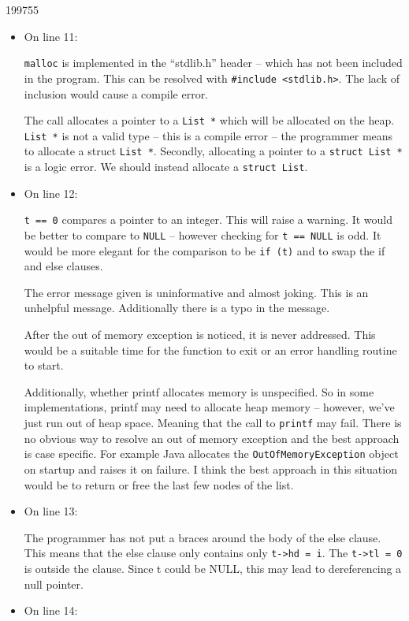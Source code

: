 \documentclass[10pt,\jkfside,a4paper]{article}
\begin{document}
\begin{examquestion}{1997}{5}{5}
\begin{itemize}
\item On line 11:

\texttt{malloc} is implemented in the ``stdlib.h'' header -- which has not been
included in the program. This can be resolved with \texttt{\#include <stdlib.h>}.
The lack of inclusion would cause a compile error.

The call allocates a pointer to a \texttt{List *} which will be allocated on
the heap. \texttt{List *} is not a valid type -- this is a compile error -- the
programmer means to allocate a struct \texttt{List *}. Secondly, allocating a
pointer to a \texttt{struct List *} is a logic error. We should instead allocate
a \texttt{struct List}.

\item On line 12:

\texttt{t == 0} compares a pointer to an integer. This will raise a warning.
It would be better to compare to \texttt{NULL} -- however checking for
\texttt{t == NULL} is odd. It would be more elegant for the comparison to be
\texttt{if (t)} and to swap the if and else clauses.

The error message given is uninformative and almost joking. This is an
unhelpful message. Additionally there is a typo in the message.

After the out of memory exception is noticed, it is never addressed. This
would be a suitable time for the function to exit or an error handling
routine to start.

Additionally, whether printf allocates memory is unspecified. So in some
implementations, printf may need to allocate heap memory -- however, we've
just run out of heap space. Meaning that the call to \texttt{printf} may
fail. There is no obvious way to resolve an out of memory exception and the
best approach is case specific. For example Java allocates the
\texttt{OutOfMemoryException} object on startup and raises it on failure. I
think the best approach in this situation would be to return or free the
last few nodes of the list.

\item On line 13:

The programmer has not put a braces around the body of the else clause.
This means that the else clause only contains only \texttt{t->hd = i}. The
\texttt{t->tl = 0} is outside the clause. Since t could be NULL, this may lead to
dereferencing a null pointer.

\item On line 14:


\end{itemize}
\end{examquestion}
\end{document}
